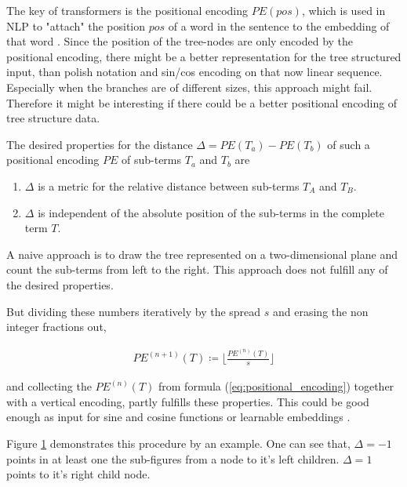 \documentclass{scrartcl}
\theoremstyle{definition}
\begin{document}
The key of transformers is the positional encoding $PE\left( pos\right)$, which is used in NLP to "attach" the position $pos$ of a word in the sentence to the embedding of that word \cite{vaswani2017attention}.
Since the position of the tree-nodes are only encoded by the positional encoding, there might be a better representation for the tree structured input,
than polish notation and sin/cos encoding on that now linear sequence.
Especially when the branches are of different sizes, this approach might fail.
Therefore it might be interesting if there could be a better positional encoding of tree structure data.

The desired properties for the distance $\Delta= PE\left( T_a \right) - PE\left( T_b \right)$ of such a positional encoding $PE$ of sub-terms $T_a$ and $T_b$ are
\begin{enumerate}[label=(\roman*)]
	\item $\Delta$ is a metric for the relative distance between sub-terms $T_A$ and $T_B$.
	\item $\Delta$ is independent of the absolute position of the sub-terms in the complete term $T$.
\end{enumerate}

A naive approach is to draw the tree represented on a two-dimensional plane and count the sub-terms from left to the right.
This approach does not fulfill any of the desired properties.

But dividing these numbers iteratively by the spread $s$ and erasing the non integer fractions out,

\begin{align}
	PE^{(n+1)}\left( T \right) \coloneqq \lfloor \frac{PE^{(n)} \left( T \right)}{s} \rfloor
	\label{eq:positional_encoding}
\end{align}

and collecting the $PE^{(n)}\left( T \right)$ from formula (\ref{eq:positional_encoding}) together with a vertical encoding, partly fulfills these properties.
This could be good enough as input for sine and cosine functions or learnable embeddings \cite{gehring2017convolutional}.

\begin{figure}[!htbp]
	\centering
	
	\label{fig:positional_encoding}
\end{figure}

Figure \ref{fig:positional_encoding} demonstrates this procedure by an example.
One can see that, $\Delta=-1$ points in at least one the sub-figures from a node to it's left children. $\Delta=1$ points to it's right child node. 
\end{document}
